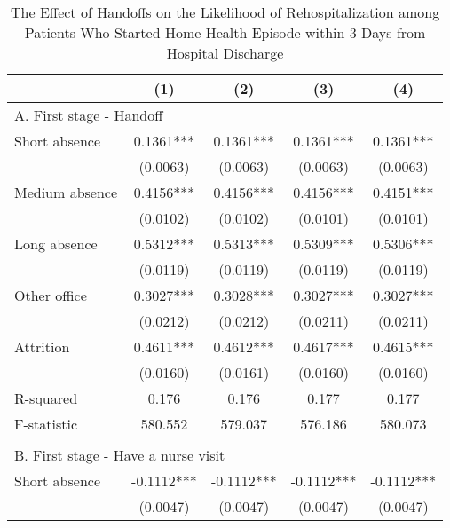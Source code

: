 \documentclass[final,12pt, notitlepage]{article}
\begin{document}
\begin{singlespace}
\begin{table}[H]
\footnotesize
\setlength\tabcolsep{0pt}
\centering
\caption{The Effect of Handoffs on the Likelihood of Rehospitalization among Patients Who Started Home Health Episode within 3 Days from Hospital Discharge}
\label{tab:iv_days_fromhospdc}
\begin{threeparttable}
{
\def\sym#1{\ifmmode^{#1}\else\(^{#1}\)\fi}
\begin{tabular*}{\textwidth}{l@{\extracolsep{\fill}}*{4}{c}}
\toprule
                    &\multicolumn{1}{c}{(1)}&\multicolumn{1}{c}{(2)}&\multicolumn{1}{c}{(3)}&\multicolumn{1}{c}{(4)}\\
\midrule
\multicolumn{5}{l}{A. First stage - Handoff} \\
Short absence       &      0.1361***&      0.1361***&      0.1361***&      0.1361***\\
                    &    (0.0063)   &    (0.0063)   &    (0.0063)   &    (0.0063)   \\
Medium absence      &      0.4156***&      0.4156***&      0.4156***&      0.4151***\\
                    &    (0.0102)   &    (0.0102)   &    (0.0101)   &    (0.0101)   \\
Long absence        &      0.5312***&      0.5313***&      0.5309***&      0.5306***\\
                    &    (0.0119)   &    (0.0119)   &    (0.0119)   &    (0.0119)   \\
Other office        &      0.3027***&      0.3028***&      0.3027***&      0.3027***\\
                    &    (0.0212)   &    (0.0212)   &    (0.0211)   &    (0.0211)   \\
Attrition           &      0.4611***&      0.4612***&      0.4617***&      0.4615***\\
                    &    (0.0160)   &    (0.0161)   &    (0.0160)   &    (0.0160)   \\
R-squared           &       0.176   &       0.176   &       0.177   &       0.177   \\
F-statistic         &     580.552   &     579.037   &     576.186   &     580.073   \\
\\
\multicolumn{5}{l}{B. First stage - Have a nurse visit} \\
Short absence       &     -0.1112***&     -0.1112***&     -0.1112***&     -0.1112***\\
                    &    (0.0047)   &    (0.0047)   &    (0.0047)   &    (0.0047)   \\

\end{tabular*}}
\end{threeparttable}
\end{table}
\end{singlespace}
\end{document}
